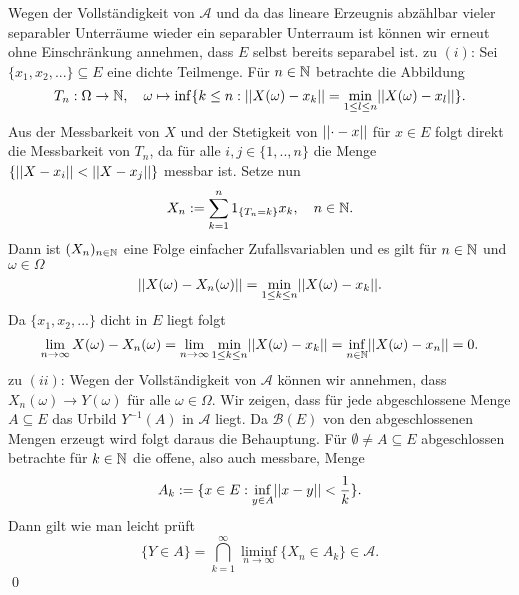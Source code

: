 \begin{proof*}
    Wegen der Vollständigkeit von $\mathcal{A}$ und da das lineare Erzeugnis abzählbar vieler separabler Unterräume wieder ein separabler Unterraum ist können wir erneut ohne Einschränkung annehmen, dass $E$ selbst bereits separabel ist.
    \newline 
    zu $(i)$:
    Sei $\{x_1,x_2,... \} \subseteq E$ eine dichte Teilmenge. Für $n \in \mathbb{N}$ betrachte die Abbildung
    $$
        T_n: \Omega \to \mathbb{N}, \quad \omega \mapsto \inf\{k \leq n: \lvert\lvert X(\omega)-x_k \rvert\rvert = \min_{1\leq l \leq n}\lvert\lvert X(\omega)-x_l \rvert\rvert\}.
    $$ 
    Aus der Messbarkeit von $X$ und der Stetigkeit von $\lvert\lvert \cdot - x \rvert\rvert$ für $x \in E$ folgt direkt die Messbarkeit von $T_n$,
    da für alle $i,j \in \{1,..,n\}$ die Menge $\{\lvert\lvert X - x_i \rvert\rvert < \lvert\lvert X - x_j \rvert\rvert\}$ messbar ist. Setze nun
    $$
        X_n := \sum_{k=1}^n 1_{\{T_n = k\}}x_k, \quad n \in \mathbb{N}.
    $$
    Dann ist $(X_n)_{n \in \mathbb{N}}$ eine Folge einfacher Zufallsvariablen und es gilt für $n \in \mathbb{N}$ und $\omega \in \Omega$
    $$
        \lvert\lvert X(\omega)-X_n(\omega) \rvert\rvert = \min_{1\leq k \leq n}\lvert\lvert X(\omega)-x_k \rvert\rvert.
    $$
    Da $\{x_1,x_2,...\}$ dicht in $E$ liegt folgt 
    $$
        \lim_{n \to \infty}{X(\omega) - X_n(\omega)} = \lim_{n \to \infty}\min_{1\leq k \leq n}\lvert\lvert X(\omega)- x_k \rvert\rvert = \inf_{n \in \mathbb{N}} \lvert\lvert X(\omega)- x_n \rvert\rvert = 0. 
    $$
    zu $(ii)$: Wegen der Vollständigkeit von $\mathcal{A}$ können wir annehmen, dass $X_n(\omega) \to Y(\omega)$ für alle $\omega \in \Omega$. 
    Wir zeigen, dass für jede abgeschlossene Menge $A \subseteq E$ das Urbild $Y^{-1}(A)$ in $\mathcal{A}$ liegt. 
    Da $\mathcal{B}(E)$ von den abgeschlossenen Mengen erzeugt wird folgt daraus die Behauptung. 
    Für $\emptyset \neq A \subseteq E$ abgeschlossen betrachte für $k \in \mathbb{N}$ die offene, also auch messbare, Menge 
    $$
        A_k := \{x \in E: \inf_{y\in A}\lvert\lvert x-y \rvert\rvert < \frac{1}{k}\}.
    $$
    Dann gilt wie man leicht prüft
    $$
        \{Y \in A\} = \bigcap_{k=1}^{\infty}\liminf_{n \to \infty}\{X_n \in A_k\} \in \mathcal{A}. 
    $$
    \qed 

\end{proof*}

